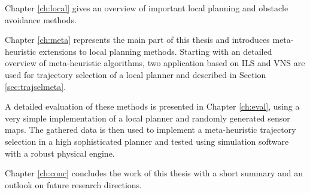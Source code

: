 Chapter \ref{ch:local} gives an overview of important local planning and obstacle avoidance methods.
 
Chapter \ref{ch:meta} represents the main part of this thesis and introduces meta-heuristic extensions to local planning methods. 
Starting with an detailed overview of  meta-heuristic algorithms, two application based on ILS and VNS are used for trajectory selection of a local planner and described in Section \ref{sec:trajselmeta}.

A detailed evaluation of these methods is presented in Chapter \ref{ch:eval}, using a very simple implementation of a local planner and randomly generated sensor maps. 
The gathered data is then used to implement a meta-heuristic trajectory selection in a high sophisticated planner and tested using simulation software with a robust physical engine.

Chapter \ref{ch:conc} concludes the work of this thesis with a short summary and an outlook on future research directions.




